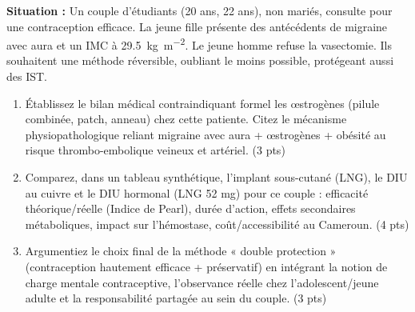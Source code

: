 \documentclass[11pt]{article}
\begin{document}
\begin{exercice}
\textbf{Situation :} Un couple d'étudiants (20 ans, 22 ans), non mariés, consulte pour une contraception efficace. La jeune fille présente des antécédents de migraine avec aura et un IMC à \SI{29,5}{\kilo\gram\per\meter\squared}. Le jeune homme refuse la vasectomie. Ils souhaitent une méthode réversible, oubliant le moins possible, protégeant aussi des IST.

\begin{enumerate}
    \item Établissez le bilan médical contraindiquant formel les œstrogènes (pilule combinée, patch, anneau) chez cette patiente. Citez le mécanisme physiopathologique reliant migraine avec aura + œstrogènes + obésité au risque thrombo-embolique veineux et artériel. (3 pts)
    \item Comparez, dans un tableau synthétique, l'implant sous-cutané (LNG), le DIU au cuivre et le DIU hormonal (LNG 52 mg) pour ce couple : efficacité théorique/réelle (Indice de Pearl), durée d'action, effets secondaires métaboliques, impact sur l'hémostase, coût/accessibilité au Cameroun. (4 pts)
    \item Argumentiez le choix final de la méthode « double protection » (contraception hautement efficace + préservatif) en intégrant la notion de charge mentale contraceptive, l'observance réelle chez l'adolescent/jeune adulte et la responsabilité partagée au sein du couple. (3 pts)
\end{enumerate}
\end{exercice}
\end{document}
